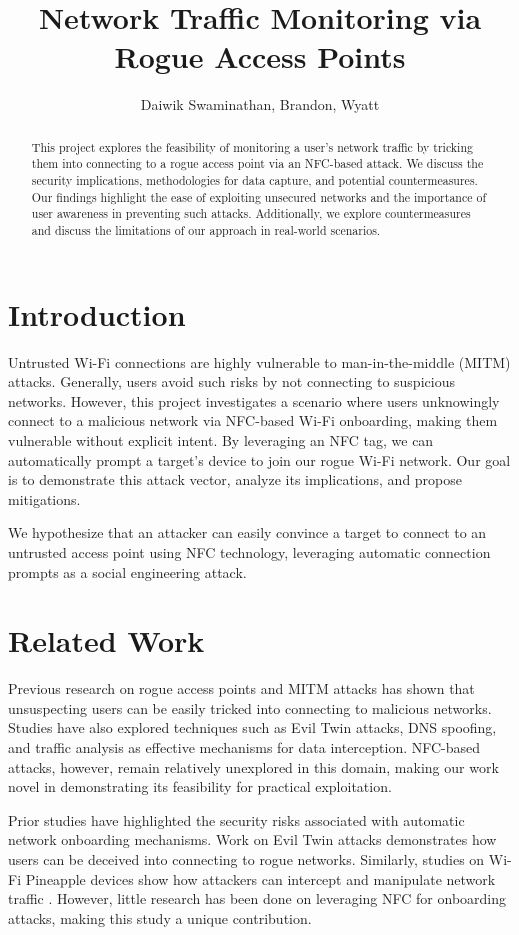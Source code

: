 \documentclass[sigconf]{acmart}
\title{Network Traffic Monitoring via Rogue Access Points}
\author{Daiwik Swaminathan, Brandon, Wyatt}
\affiliation{\institution{California Polytechnic State University, San Luis Obispo}}
\begin{document}
\begin{abstract}
This project explores the feasibility of monitoring a user's network traffic by tricking them into connecting to a rogue access point via an NFC-based attack. We discuss the security implications, methodologies for data capture, and potential countermeasures. Our findings highlight the ease of exploiting unsecured networks and the importance of user awareness in preventing such attacks. Additionally, we explore countermeasures and discuss the limitations of our approach in real-world scenarios.
\end{abstract}

\maketitle

\section{Introduction}
Untrusted Wi-Fi connections are highly vulnerable to man-in-the-middle (MITM) attacks. Generally, users avoid such risks by not connecting to suspicious networks. However, this project investigates a scenario where users unknowingly connect to a malicious network via NFC-based Wi-Fi onboarding, making them vulnerable without explicit intent. By leveraging an NFC tag, we can automatically prompt a target's device to join our rogue Wi-Fi network. Our goal is to demonstrate this attack vector, analyze its implications, and propose mitigations.

We hypothesize that an attacker can easily convince a target to connect to an untrusted access point using NFC technology, leveraging automatic connection prompts as a social engineering attack.

\section{Related Work}
Previous research on rogue access points and MITM attacks has shown that unsuspecting users can be easily tricked into connecting to malicious networks. Studies have also explored techniques such as Evil Twin attacks, DNS spoofing, and traffic analysis as effective mechanisms for data interception. NFC-based attacks, however, remain relatively unexplored in this domain, making our work novel in demonstrating its feasibility for practical exploitation.

Prior studies have highlighted the security risks associated with automatic network onboarding mechanisms. Work on Evil Twin attacks \cite{eviltwin} demonstrates how users can be deceived into connecting to rogue networks. Similarly, studies on Wi-Fi Pineapple devices show how attackers can intercept and manipulate network traffic \cite{wifipineapple}. However, little research has been done on leveraging NFC for onboarding attacks, making this study a unique contribution.
\end{document}
